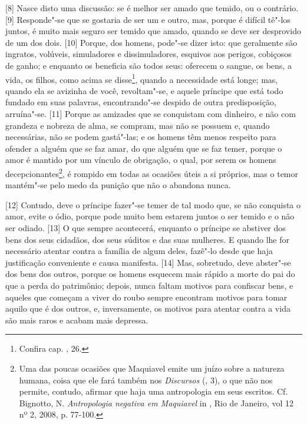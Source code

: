 {[}8{]} Nasce disto uma discussão: se é melhor ser amado que temido, ou
o contrário. {[}9{]} Responde"-se que se gostaria de ser um e outro, mas,
porque é difícil tê"-los juntos, é muito mais seguro ser temido que
amado, quando se deve ser desprovido de um dos dois. {[}10{]} Porque,
dos homens, pode"-se dizer isto: que geralmente são ingratos, volúveis,
simuladores e dissimuladores, esquivos aos perigos, cobiçosos de ganho;
e enquanto os beneficia são todos seus: oferecem o sangue, os bens, a
vida, os filhos, como acima se disse\footnote{Confira cap. , 26.},
quando a necessidade está longe; mas, quando ela se avizinha de você,
revoltam"-se, e aquele príncipe que está todo fundado em suas palavras,
encontrando"-se despido de outra predisposição, arruína"-se. {[}11{]}
Porque as amizades que se conquistam com dinheiro, e não com grandeza e
nobreza de alma, se compram, mas não se possuem e, quando necessárias,
não se podem gastá"-las; e os homens têm menos respeito para ofender a
alguém que se faz amar, do que alguém que se faz temer, porque o amor é
mantido por um vínculo de obrigação, o qual, por serem os homens
decepcionantes\footnote{Uma das poucas ocasiões que Maquiavel emite um
  juízo sobre a natureza humana, coisa que ele fará também nos
  \emph{Discursos} (, 3), o que não nos permite, contudo, afirmar que
  haja uma antropologia em seus escritos. Cf. Bignotto, N.
  \emph{Antropologia negativa em Maquiavel} in , Rio de
  Janeiro, vol 12 nº 2, 2008, p. 77-100.}, é rompido em todas as
ocasiões úteis a si próprios, mas o temor mantém"-se pelo medo da punição
que não o abandona nunca.

{[}12{]} Contudo, deve o príncipe fazer"-se temer de tal modo que, se não
conquista o amor, evite o ódio, porque pode muito bem estarem juntos o
ser temido e o não ser odiado. {[}13{]} O que sempre acontecerá,
enquanto o príncipe se abstiver dos bens dos seus cidadãos, dos seus
súditos e das suas mulheres. E quando lhe for necessário atentar contra
a família de algum deles, fazê"-lo desde que haja justificação
conveniente e causa manifesta. {[}14{]} Mas, sobretudo, deve abster"-se
dos bens dos outros, porque os homens esquecem mais rápido a morte do
pai do que a perda do patrimônio; depois, nunca faltam motivos para
confiscar bens, e aqueles que começam a viver do roubo sempre encontram
motivos para tomar aquilo que é dos outros, e, inversamente, os motivos
para atentar contra a vida são mais raros e acabam mais depressa.

